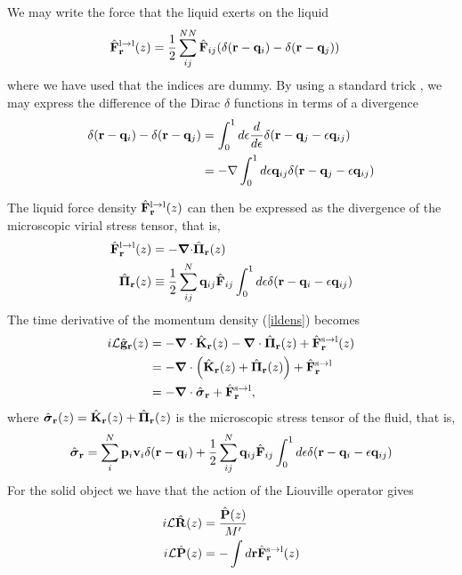 \documentclass[b5paper,openright,10pt]{book}
\begin{document}
We may write the force that the liquid exerts on the liquid 
\begin{align}
  \hat{\bf F}^{\rm l\to l}_{\bf r}(z) &= \frac{1}{2}\sum^{NN}_{ij}\hat{\bf F}_{ij}
(\delta({\bf r}-{\bf q}_i)-\delta({\bf r}-{\bf q}_j))
\end{align}
where we  have used that  the indices are  dummy. By using  a standard
trick \cite{Schofield1982,Grabert1982}, we  may express the difference
of the Dirac $\delta$ functions in terms of a divergence
\begin{align}
\delta({\bf r}-{\bf q}_i)-\delta({\bf r}-{\bf q}_j)
    &=\int_0^1d\epsilon\frac{d}{d\epsilon}
\delta({\bf r}-{\bf q}_j-\epsilon{\bf q}_{ij})
\nonumber\\
    &=-\nabla\int_0^1d\epsilon{\bf q}_{ij}
\delta({\bf r}-{\bf q}_j-\epsilon{\bf q}_{ij})
\nonumber\\
\label{trick}
\end{align}

The liquid  force density  $\hat{\bf F}^{\rm  l\to l}_{\bf  r}(z)$ can
then be expressed  as the divergence of the  microscopic virial stress
tensor, that is,
\begin{align}
\hat{\bf F}^{\rm l\to l}_{\bf r}(z)&=-\boldsymbol{\nabla}{\cdot} \hat{\boldsymbol{\Pi}}_{\bf r}(z)
\nonumber\\
\hat{\boldsymbol{\Pi}}_{\bf r}(z)&\equiv \frac{1}{2}\sum^{N}_{ij}{\bf q}_{ij}\hat{\bf F}_{ij}
\int_0^{1}d\epsilon \delta({\bf r}-{\bf q}_i-\epsilon{\bf q}_{ij})
\label{micfluxes}
\end{align}
The time derivative of the momentum density (\ref{ildens}) becomes
\begin{align}
  i{\cal L}\hat{\bf g}_{\bf r}(z)
    &=-\boldsymbol{\nabla}\cdot \hat{{\bf K}}_{\bf r}(z) - \boldsymbol{\nabla}\cdot \hat{{\bf     \Pi}}_{\bf r}(z) +  \hat{{\bf F}}^{\rm s\to l}_{\bf r}(z) \nonumber \\
    &= -\boldsymbol{\nabla}\cdot\left(\hat{{\bf K}}_{\bf r}(z)+\hat{{\bf \Pi}}_{\bf r}(z)\right) +\hat{{\bf F}}^{\rm s\to l}_{\bf r} \nonumber \\
    &=-\boldsymbol{\nabla}\cdot \hat{\boldsymbol{\sigma}}_{\bf r}+\hat{{\bf F}}^{\rm s\to l}_{\bf r},
\label{gls}
\end{align}
where     $\hat{\boldsymbol{\sigma}}_{\bf r}(z)=\hat{{\bf K}}_{\bf
r}(z)+\hat{\boldsymbol{\Pi}}_{\bf r}(z)$  is the microscopic stress
tensor of the fluid, that is,
\begin{align}
  \hat{\boldsymbol{\sigma}}_{\bf r}=
\sum^{N}_i{\bf p}_i{\bf v}_i
\delta({\bf r}-{\bf q}_i)
+
\frac{1}{2}\sum^{N}_{ij}{\bf q}_{ij}\hat{\bf F}_{ij}
\int_0^{1}d\epsilon \delta({\bf r}-{\bf q}_i-\epsilon{\bf q}_{ij})
\label{sigma}
\end{align}
For the solid object we have that the action of the Liouville operator gives
\begin{align}
  i{\cal L}\hat{\bf R}(z) &=\frac{\hat{\bf P}(z)}{M'}
  \nonumber\\
  i{\cal L}\hat{\bf P}(z) &=-\int  d{\bf r} \hat{\bf F}^{\rm s\to l}_{\bf r}(z)
   \label{Pfsl}  
\end{align} 
\end{document}
